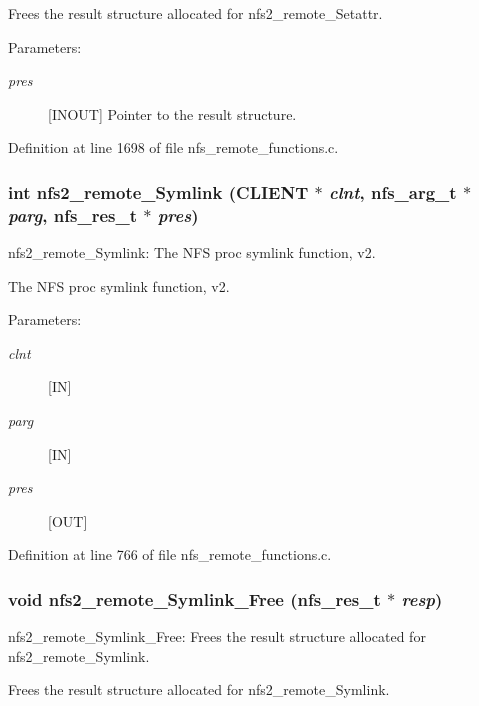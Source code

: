 Frees the result structure allocated for nfs2\_\-remote\_\-Setattr.

\begin{Desc}
\item[Parameters:]
\begin{description}
\item[{\em pres}][INOUT] Pointer to the result structure. \end{description}
\end{Desc}


Definition at line 1698 of file nfs\_\-remote\_\-functions.c.
\subsubsection{\setlength{\rightskip}{0pt plus 5cm}int nfs2\_\-remote\_\-Symlink (CLIENT $\ast$ {\em clnt}, nfs\_\-arg\_\-t $\ast$ {\em parg}, nfs\_\-res\_\-t $\ast$ {\em pres})}\label{group__NFSprocs_ga13}


nfs2\_\-remote\_\-Symlink: The NFS proc symlink function, v2.

The NFS proc symlink function, v2.

\begin{Desc}
\item[Parameters:]
\begin{description}
\item[{\em clnt}][IN] \item[{\em parg}][IN] \item[{\em pres}][OUT] \end{description}
\end{Desc}


Definition at line 766 of file nfs\_\-remote\_\-functions.c.
\subsubsection{\setlength{\rightskip}{0pt plus 5cm}void nfs2\_\-remote\_\-Symlink\_\-Free (nfs\_\-res\_\-t $\ast$ {\em resp})}\label{group__NFSprocs_ga62}


nfs2\_\-remote\_\-Symlink\_\-Free: Frees the result structure allocated for nfs2\_\-remote\_\-Symlink.

Frees the result structure allocated for nfs2\_\-remote\_\-Symlink.

